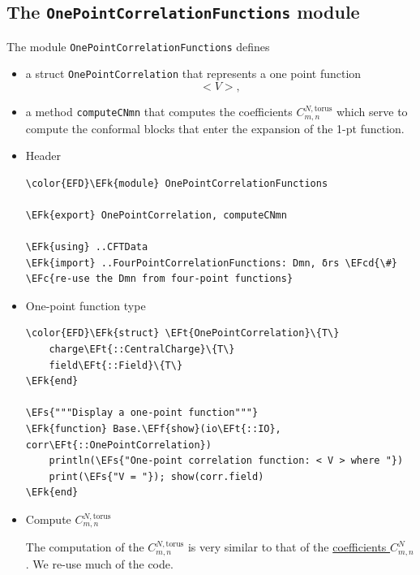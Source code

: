 \documentclass[a4paper]{article}
\numberwithin{equation}{section}
\newcommand{\EFc}[1]{\textcolor{EFc}{#1}} %
\newcommand{\EFcd}[1]{\textcolor{EFcd}{#1}} %
\newcommand{\EFs}[1]{\textcolor{EFs}{#1}} %
\newcommand{\EFk}[1]{\textcolor{EFk}{#1}} %
\newcommand{\EFf}[1]{\textcolor{EFf}{#1}} %
\newcommand{\EFt}[1]{\textcolor{EFt}{#1}} %
\begin{document}
\subsection{The \texttt{OnePointCorrelationFunctions} module}
\label{sec:orga3ebd22}
The module \texttt{OnePointCorrelationFunctions} defines

\begin{itemize}
\item a struct \texttt{OnePointCorrelation} that represents a one point function \[
  < V >,
  \]
\item a method \texttt{computeCNmn} that computes the coefficients \(C^{N,\text{torus}}_{m,n}\) which serve to compute the conformal blocks that enter the expansion of the 1-pt function.
\end{itemize}
\begin{itemize}
\item Header
\label{sec:org77308c6}

\begin{Code}
\begin{Verbatim}
\color{EFD}\EFk{module} OnePointCorrelationFunctions

\EFk{export} OnePointCorrelation, computeCNmn

\EFk{using} ..CFTData
\EFk{import} ..FourPointCorrelationFunctions: Dmn, δrs \EFcd{\#} \EFc{re-use the Dmn from four-point functions}
\end{Verbatim}
\end{Code}
\item One-point function type
\label{sec:orgf76f5ef}

\begin{Code}
\begin{Verbatim}
\color{EFD}\EFk{struct} \EFt{OnePointCorrelation}\{T\}
    charge\EFt{::CentralCharge}\{T\}
    field\EFt{::Field}\{T\}
\EFk{end}

\EFs{"""Display a one-point function"""}
\EFk{function} Base.\EFf{show}(io\EFt{::IO}, corr\EFt{::OnePointCorrelation})
    println(\EFs{"One-point correlation function: < V > where "})
    print(\EFs{"V = "}); show(corr.field)
\EFk{end}
\end{Verbatim}
\end{Code}
\item Compute \(C^{N,\text{torus}}_{m,n}\)
\label{sec:orgaa3bce7}

The computation of the \(C^{N,\text{torus}}_{m,n}\) is very similar to that of the \hyperref[sec:org243d2aa]{coefficients \(C^{N}_{m,n}\)}. We re-use much of the code.


\end{itemize}
\end{document}
